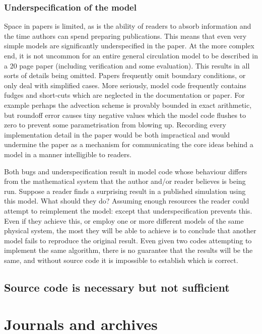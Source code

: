 \documentclass[a4paper,11pt]{article}
\begin{document}
\subsubsection{Underspecification of the model}

Space in papers is limited, as is the ability of readers to absorb
information and the time authors can spend preparing publications. This
means that even very simple models are significantly underspecified in the
paper. At the more complex end, it is not uncommon for an entire general
circulation model to be described in a 20 page paper (including verification
and some evaluation). This results in all sorts of details being
omitted. Papers frequently omit boundary conditions, or only deal with
simplified cases. More seriously, model code frequently contains fudges and
short-cuts which are neglected in the documentation or paper. For example
perhaps the advection scheme is provably bounded in exact arithmetic, but
roundoff error causes tiny negative values which the model code flushes to
zero to prevent some parametrisation from blowing up. Recording every
implementation detail in the paper would be both impractical and would
undermine the paper as a mechanism for communicating the core ideas behind a
model in a manner intelligible to readers. 

Both bugs and underspecification result in model code whose behaviour
differs from the mathematical system that the author and/or reader believes
is being run. Suppose a reader finds a surprising result in a published
simulation using this model. What should they do? Assuming enough resources
the reader could attempt to reimplement the model: except that
underspecification prevents this. Even if they achieve this, or employ
one or more different models of the same physical system, the most they will
be able to achieve is to conclude that another model fails to reproduce the
original result. Even given two codes attempting to implement the same algorithm, there
is no guarantee that the results will be the same, and without source code
it is impossible to establish which is correct.

\subsection{Source code is necessary but not sufficient}




\section{Journals and archives}
\end{document}
